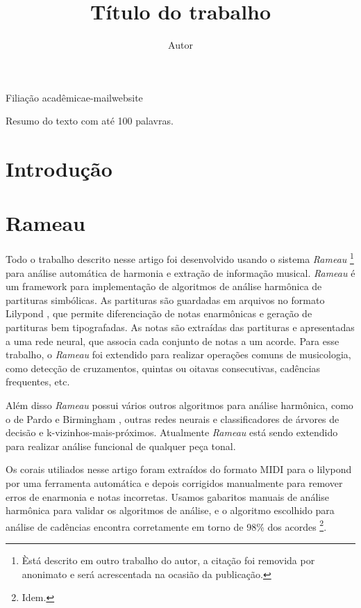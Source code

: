 \documentclass{article}
\newcommand{\rameau}{\textit{Rameau}}
\begin{document}
\graphicspath{{figs/}}

\title{Título do trabalho}
\author{Autor}{Filiação acadêmica}{e-mail}{website}

\begin{sumario}
  Resumo do texto com até 100 palavras.  
\end{sumario}


\section{Introdução}
\label{sec:introducao}


\section{Rameau}
\label{sec:rameau}

Todo o trabalho descrito nesse artigo foi desenvolvido usando o
sistema \rameau{} \footnote{Èstá descrito em outro trabalho do autor,
  a citação foi removida por anonimato e será acrescentada na ocasião
  da publicação.} para análise automática de harmonia e extração de
informação musical. \rameau{} é um framework para implementação de
algoritmos de análise harmônica de partituras simbólicas. As
partituras são guardadas em arquivos no formato Lilypond
\cite{nienhuys.ea08:lilypond}, que permite diferenciação de notas
enarmônicas e geração de partituras bem tipografadas. As notas são
extraídas das partituras e apresentadas a uma rede neural, que associa
cada conjunto de notas a um acorde. Para esse trabalho, o \rameau{}
foi extendido para realizar operações comuns de musicologia, como
detecção de cruzamentos, quintas ou oitavas consecutivas, cadências
frequentes, etc.

Além disso \rameau{}  possui vários outros algoritmos para análise
harmônica, como o de Pardo e Birmingham \cite{pardo.ea00:automated},
outras redes neurais e classificadores de árvores de decisão e
k-vizinhos-mais-próximos. Atualmente \rameau{}  está sendo extendido para
realizar análise funcional de qualquer peça tonal.

Os corais utiliados nesse artigo foram extraídos do formato MIDI para
o lilypond por uma ferramenta automática e depois corrigidos
manualmente para remover erros de enarmonia e notas incorretas. Usamos
gabaritos manuais de análise harmônica para validar os algoritmos de
análise, e o algoritmo escolhido para análise de cadências encontra
corretamente em torno de 98\% dos acordes \footnote{Idem.}.
\end{document}

